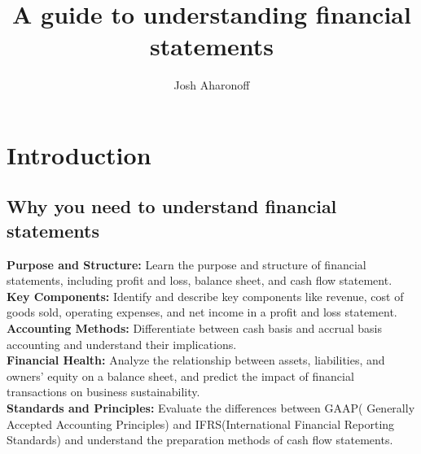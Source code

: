 \documentclass[12pt]{article}
\begin{document}

\title{\textbf{A guide to understanding financial statements}}
\author{Josh Aharonoff}
\maketitle

\newpage
\tableofcontents
\newpage

\newpage
\section{Introduction}

\subsection{Why you need to understand financial statements}
\textbf{Purpose and Structure:}  Learn the purpose and structure of financial statements, including profit and loss, balance sheet, and cash flow statement.\\
\textbf{Key Components:} Identify and describe key components like revenue, cost of goods sold, operating expenses, and net income in a profit and loss statement.\\
\textbf{Accounting Methods:}  Differentiate between cash basis and accrual basis accounting and understand their implications.\\
\textbf{Financial Health:}  Analyze the relationship between assets, liabilities, and owners' equity on a balance sheet, and predict the impact of financial transactions on business sustainability.\\
\textbf{Standards and Principles:}  Evaluate the differences between GAAP( Generally Accepted Accounting Principles) and IFRS(International Financial Reporting Standards) and understand the preparation methods of cash flow statements.

\end{document}
